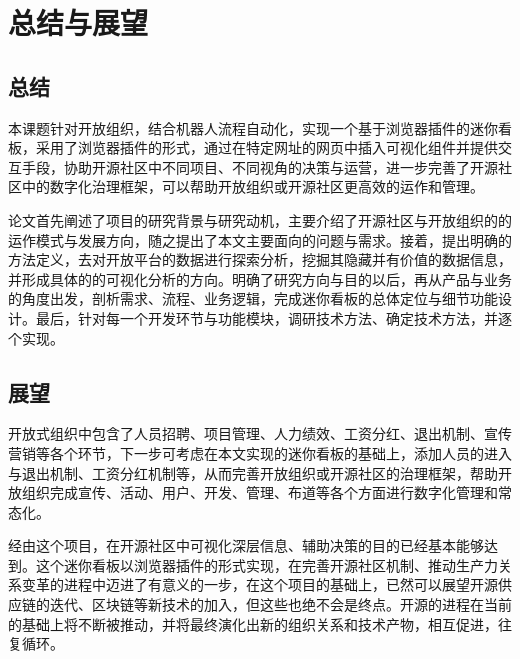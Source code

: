 \section{总结与展望}
\subsection{总结}
\par 本课题针对开放组织，结合机器人流程自动化，实现一个基于浏览器插件的迷你看板，采用了浏览器插件的形式，通过在特定网址的网页中插入可视化组件并提供交互手段，协助开源社区中不同项目、不同视角的决策与运营，进一步完善了开源社区中的数字化治理框架，可以帮助开放组织或开源社区更高效的运作和管理。
\par 论文首先阐述了项目的研究背景与研究动机，主要介绍了开源社区与开放组织的的运作模式与发展方向，随之提出了本文主要面向的问题与需求。接着，提出明确的方法定义，去对开放平台的数据进行探索分析，挖掘其隐藏并有价值的数据信息，并形成具体的的可视化分析的方向。明确了研究方向与目的以后，再从产品与业务的角度出发，剖析需求、流程、业务逻辑，完成迷你看板的总体定位与细节功能设计。最后，针对每一个开发环节与功能模块，调研技术方法、确定技术方法，并逐个实现。

\subsection{展望}
\par 开放式组织中包含了人员招聘、项目管理、人力绩效、工资分红、退出机制、宣传营销等各个环节，下一步可考虑在本文实现的迷你看板的基础上，添加人员的进入与退出机制、工资分红机制等，从而完善开放组织或开源社区的治理框架，帮助开放组织完成宣传、活动、用户、开发、管理、布道等各个方面进行数字化管理和常态化。

\par 经由这个项目，在开源社区中可视化深层信息、辅助决策的目的已经基本能够达到。这个迷你看板以浏览器插件的形式实现，在完善开源社区机制、推动生产力关系变革的进程中迈进了有意义的一步，在这个项目的基础上，已然可以展望开源供应链的迭代、区块链等新技术的加入，但这些也绝不会是终点。开源的进程在当前的基础上将不断被推动，并将最终演化出新的组织关系和技术产物，相互促进，往复循环。